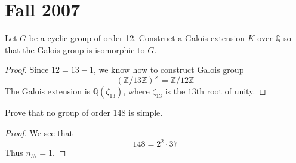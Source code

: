 \documentclass[openany]{book}
\newcommand{\Z}{\mathbb{Z}}
\newcommand{\Q}{\mathbb{Q}}
\begin{document}
\chapter{Fall 2007}


\begin{prob}
    Let \(G\) be a cyclic group of order 12. Construct a Galois extension \(K\) over \(\mathbb{Q}\) so that the Galois group is isomorphic to \(G\).
\end{prob}
\begin{proof}
    Since $12=13-1$, we know how to construct Galois group 
    \begin{equation*}
        \left(\Z/13\Z\right)^\times=\Z/12\Z
    \end{equation*}
    The Galois extension is $\Q(\zeta_{13})$, where $\zeta_{13}$ is the $13$th root of unity.
\end{proof}



\begin{prob}
    Prove that no group of order 148 is simple.
\end{prob}
\begin{proof}
    We see that 
    \begin{equation*}
        148=2^2\cdot 37
    \end{equation*}
    Thus $n_{37}=1$.
\end{proof}
\end{document}
